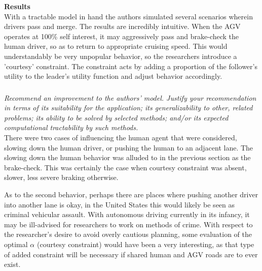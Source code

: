 \documentclass[12pt]{amsart}
\begin{document}
\textbf{Results} \\

With a tractable model in hand the authors simulated several scenarios wherein drivers pass and merge.
The results are incredibly intuitive.
When the AGV operates at 100\% self interest, it may aggressively pass and brake-check the human driver,
so as to return to appropriate cruising speed. 
This would understandably be very unpopular behavior, so the researchers introduce a 'courtesy' constraint.
The constraint acts by adding a proportion of the follower's utility to the leader's utility function
and adjust behavior accordingly.


\subsubsection{}
\textit{Recommend an improvement to the authors’ model. Justify your recommendation in terms of its suitability for the application; its generalizability to other, related problems; its ability to be solved by selected methods; and/or its expected computational tractability by such methods.} \\

There were two cases of influencing the human agent that were considered, slowing down the human driver, 
or pushing the human to an adjacent lane.
The slowing down the human behavior was alluded to in the previous section as the brake-check.
This was certainly the case when courtesy constraint was absent, slower, less severe braking otherwise.

As to the second behavior, perhaps there are places where pushing another driver into another lane is okay,
in the United States this would likely be seen as criminal vehicular assault.
With autonomous driving currently in its infancy, it may be ill-advised for researchers to work on methods of crime.
With respect to the researcher's desire to avoid overly cautious planning, some evaluation of the optimal 
$\alpha$ (courtesy constraint) would have been a very interesting, as that type of added constraint
will be necessary if shared human and AGV roads are to ever exist. \\
\end{document}
